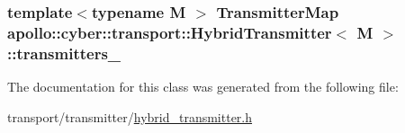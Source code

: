 \hypertarget{classapollo_1_1cyber_1_1transport_1_1HybridTransmitter_af892972e289032b86439449acb60fffe}{
\subsubsection[{transmitters\-\_\-}]{\setlength{\rightskip}{0pt plus 5cm}template$<$typename M $>$ {\bf Transmitter\-Map} {\bf apollo\-::cyber\-::transport\-::\-Hybrid\-Transmitter}$<$ M $>$\-::transmitters\-\_\-\hspace{0.3cm}{\ttfamily [private]}}}\label{classapollo_1_1cyber_1_1transport_1_1HybridTransmitter_af892972e289032b86439449acb60fffe}


The documentation for this class was generated from the following file\-:\begin{DoxyCompactItemize}
\item 
transport/transmitter/\hyperlink{hybrid__transmitter_8h}{hybrid\-\_\-transmitter.\-h}\end{DoxyCompactItemize}
